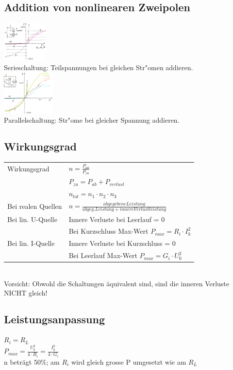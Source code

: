 \subsection{Addition von nonlinearen Zweipolen}
\begin{multicols}{2}
\includegraphics[width=0.17\textwidth]{pics/kennlinien/nonlinAddPar}\\
Serieschaltung: Teilspannungen bei gleichen Str"omen addieren.\\
\includegraphics[width=0.2\textwidth]{pics/kennlinien/nonlinAddSer}\\
Parallelschaltung: Str"ome bei gleicher Spannung addieren.\\
\end{multicols}

\subsection{Wirkungsgrad}
\begin{tabular}{ll}
Wirkungsgrad & $n = \frac{P_{ab}}{P_{zu}}$ \\
& $ P_{zu} = P_{ab}+P_{verlust} $\\
& $ n_{tot} = n_1 \cdot n_2 \cdot n_3 $\\
Bei realen Quellen & $n = \frac{abgegebene Leistung}{abgeg. Leistung + innere Verlustleistung}$\\
Bei lin. U-Quelle & Innere Verluste bei Leerlauf = 0\\
& Bei Kurzschluss Max-Wert $P_{max} = R_i \cdot I_k^2$\\
Bei lin. I-Quelle & Innere Verluste bei Kurzschluss = 0\\
& Bei Leerlauf Max-Wert $P_{max} = G_i \cdot U_0^2$\\
\end{tabular}\\
Vorsicht: Obwohl die Schaltungen äquivalent sind, sind die inneren Verluste NICHT gleich!

\subsection{Leistungsanpassung}
$R_i = R_L$ \\
$P_{max} = \frac{U_q^2}{4 \cdot R_i} = \frac{I_q^2}{4 \cdot G_i}$\\
n beträgt 50\%; am $R_i$ wird gleich grosse P umgesetzt wie am $R_L$\\

